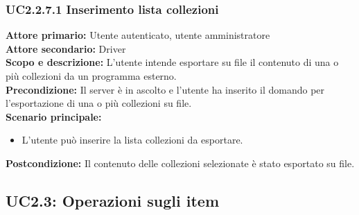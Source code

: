 \documentclass{scalatekids-article}
\begin{document}
\subsubsection{UC2.2.7.1 Inserimento lista collezioni}

\textbf{Attore primario:} Utente autenticato, utente amministratore\\
\textbf{Attore secondario:} Driver\\
\textbf{Scopo e descrizione:} L'utente intende esportare su file il contenuto di una o più collezioni da un programma  esterno.\\
\textbf{Precondizione:} Il server è in ascolto e l'utente ha inserito il domando per l'esportazione di una o più collezioni su file.\\
\textbf{Scenario principale:}
\begin{itemize}
\item L'utente può inserire la lista collezioni da esportare. %
\end{itemize}
\textbf{Postcondizione:} Il contenuto delle collezioni selezionate è stato esportato su file.


\subsection{UC2.3: Operazioni sugli item}
\end{document}
